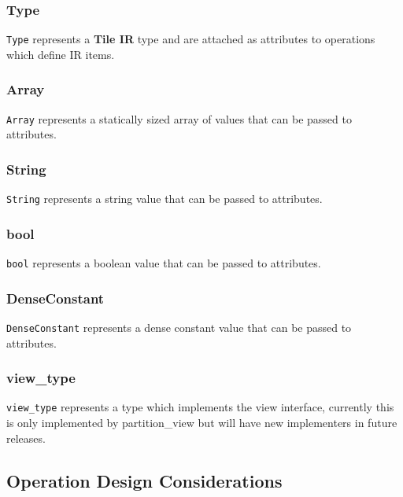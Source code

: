 \documentclass{article}
\begin{document}
\subsubsection{Type}

\texttt{Type} represents a \textbf{Tile IR} type and are attached as attributes to operations which define IR items.



\subsubsection{Array}

\texttt{Array} represents a statically sized array of values that can be passed to attributes.



\subsubsection{String}

\texttt{String} represents a string value that can be passed to attributes.



\subsubsection{bool}

\texttt{bool} represents a boolean value that can be passed to attributes.



\subsubsection{DenseConstant}

\texttt{DenseConstant} represents a dense constant value that can be passed to attributes.



\subsubsection{view\_type}

\texttt{view\_type} represents a type which implements the view interface, currently this is only implemented by partition\_view but will have new implementers in future releases.



\subsection{Operation Design Considerations}
\end{document}
